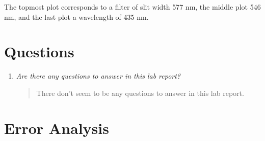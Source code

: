 \documentclass{amsart}
\begin{document}
The topmost plot corresponds to a filter of slit width 577 nm, the middle plot 546 nm, and the last plot a wavelength of 435 nm.
\section{Questions}

\begin{enumerate}
    \item {\textit{Are there any questions to answer in this lab report?}
\begin{quote}
There don't seem to be any questions to answer in this lab report.
\end{quote}}

\end{enumerate}

\section{Error Analysis}
\end{document}
